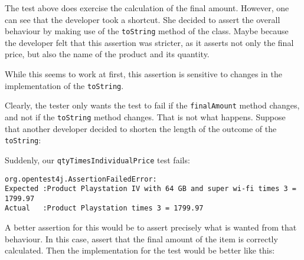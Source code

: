 The test above does exercise the calculation of the final amount.
However, one can see that the developer took a shortcut. She decided to
assert the overall behaviour by making use of the \texttt{toString}
method of the class. Maybe because the developer felt that this
assertion was stricter, as it asserts not only the final price, but also
the name of the product and its quantity.

While this seems to work at first, this assertion is sensitive to
changes in the implementation of the \texttt{toString}.

Clearly, the tester only wants the test to fail if the
\texttt{finalAmount} method changes, and not if the \texttt{toString}
method changes. That is not what happens. Suppose that another developer
decided to shorten the length of the outcome of the \texttt{toString}:

\begin{Shaded}
\begin{Highlighting}[]
  \NormalTok{() \{}
     \NormalTok{(}\NormalTok{, }\NormalTok{(}\NormalTok{())) + }
      \NormalTok{ + }\NormalTok{();}
\NormalTok{\}}
\end{Highlighting}
\end{Shaded}

Suddenly, our \texttt{qtyTimesIndividualPrice} test fails:

\begin{verbatim}
org.opentest4j.AssertionFailedError: 
Expected :Product Playstation IV with 64 GB and super wi-fi times 3 = 1799.97
Actual   :Product Playstation times 3 = 1799.97
\end{verbatim}

A better assertion for this would be to assert precisely what is wanted
from that behaviour. In this case, assert that the final amount of the
item is correctly calculated. Then the implementation for the test would
be better like this:

\begin{Shaded}
\begin{Highlighting}[]
 \NormalTok{() \{}
 \NormalTok{(}\NormalTok{,}
            \NormalTok{,}
             \NormalTok{(}\NormalTok{));}

\NormalTok{(} \NormalTok{(}\NormalTok{());}
\NormalTok{\}}
\end{Highlighting}
\end{Shaded}

